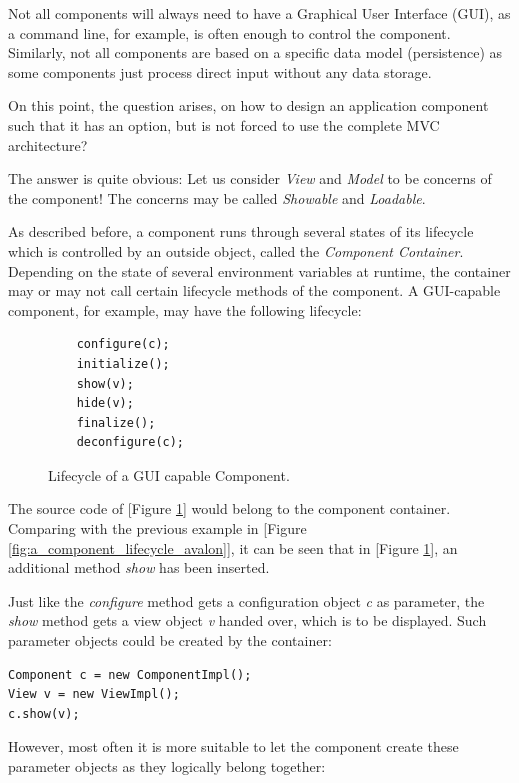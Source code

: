 \documentclass[a4paper,10pt]{llncs}
\begin{document}
Not all components will always need to have a Graphical User Interface (GUI),
as a command line, for example, is often enough to control the component.
Similarly, not all components are based on a specific data model (persistence)
as some components just process direct input without any data storage.

On this point, the question arises, on how to design an application component such
that it has an option, but is not forced to use the complete MVC architecture?

The answer is quite obvious: Let us consider \emph{View} and \emph{Model} to be concerns
of the component! The concerns may be called \emph{Showable} and \emph{Loadable}.

As described before, a component runs through several states of its lifecycle
which is controlled by an outside object, called the \emph{Component Container}.
Depending on the state of several environment variables at runtime, the
container may or may not call certain lifecycle methods of the component.
A GUI-capable component, for example, may have the following lifecycle:

\begin{figure}[ht]
\begin{verbatim}
    configure(c);
    initialize();
    show(v);
    hide(v);
    finalize();
    deconfigure(c);
\end{verbatim}
\caption{Lifecycle of a GUI capable Component.}
\label{fig:lifecycle_of_a_gui_capable_component}
\end{figure}

The source code of [Figure \ref{fig:lifecycle_of_a_gui_capable_component}]
would belong to the component container.
Comparing with the previous example in [Figure \ref{fig:a_component_lifecycle_avalon}],
it can be seen that in [Figure \ref{fig:lifecycle_of_a_gui_capable_component}],
an additional method \emph{show} has been inserted.

Just like the \emph{configure} method gets a configuration object \emph{c} as parameter,
the \emph{show} method gets a view object \emph{v} handed over, which is to be displayed.
Such parameter objects could be created by the container:

\begin{verbatim}
Component c = new ComponentImpl();
View v = new ViewImpl();
c.show(v);
\end{verbatim}

However, most often it is more suitable to let the component create these
parameter objects as they logically belong together:
\end{document}
